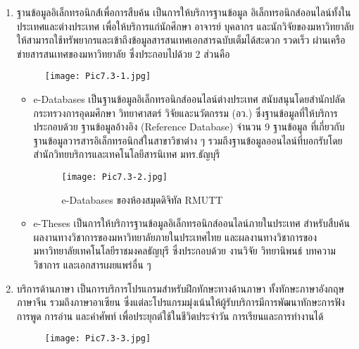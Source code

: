 \begin{enumerate}
\item ฐานข้อมูลอิเล็กทรอนิกส์์เพื่อการสืบค้น เป็นการให้บริการฐานข้อมูล
อิเล็กทรอนิกส์ออนไลน์ทั้งในประเทศและต่างประเทศ เพื่อให้บริการแก่นักศึกษา อาจารย์ บุคลากร และนักวิจัยของมหาวิทยาลัย ให้สามารถใช้ทรัพยากรและเข้าถึงข้อมูลสารสนเทศเอกสารฉบับเต็มได้สะดวก รวดเร็ว ผ่านเครือข่ายสารสนเทศของมหาวิทยาลัย  ซึ่งประกอบไปด้วย 2 ส่วนคือ
 \begin{figure}[H]
 	\begin{center}
 		\texttt{[image: Pic7.3-1.jpg]}\\
 	\end{center}
 \end{figure}
\begin{itemize}
	\item e-Databases เป็นฐานข้อมูลอิเล็กทรอนิกส์ออนไลน์ต่างประเทศ สนับสนุนโดยสำนักปลัดกระทรวงการอุดมศึกษา วิทยาศาสตร์ วิจัยและนวัตกรรม (อว.) ซึ่งฐานข้อมูลที่ให้บริการประกอบด้วย ฐานข้อมูลอ้างอิง (Reference Database) จำนวน 9 ฐานข้อมูล ที่เกี่ยวกับฐานข้อมูลวารสารอิเล็กทรอนิกส์ในสาขาวิชาต่าง ๆ รวมถึงฐานข้อมูลออนไลน์ที่บอกรับโดย สำนักวิทยบริการและเทคโนโลยีสารนิเทศ มทร.ธัญบุรี
	 \begin{figure}[H]
		\begin{center}
			\hspace*{2.2cm}
			\texttt{[image: Pic7.3-2.jpg]}\\
			\caption{e-Databases ของห้องสมุดดิจิทัล RMUTT}
		\end{center}
	\end{figure}
	\item e-Theses เป็นการให้บริการฐานข้อมูลอิเล็กทรอนิกส์ออนไลน์ภายในประเทศ สำหรับสืบค้น
	ผลงานทางวิชาการของมหาวิทยาลัยภายในประเทศไทย และผลงานทางวิชาการของมหาวิทยาลัยเทคโนโลยีราชมงคลธัญบุรี ซึ่งประกอบด้วย งานวิจัย วิทยานิพนธ์ บทความวิชาการ และเอกสารเผยแพร่อื่น ๆ
\end{itemize}
\item บริการด้านภาษา เป็นการบริการโปรแกรมสำหรับฝึกทักษะทางด้านภาษา ทั้งทักษะภาษาอังกฤษ 
ภาษาจีน รวมถึงภาษาอาเซียน ซึ่งแต่ละโปรแกรมมุ่งเน้นให้ผู้รับบริการมีการพัฒนาทักษะการฟัง การพูด การอ่าน และคำศัพท์ เพื่อประยุกต์ใช้ในชีวิตประจำวัน การเรียนและการทำงานได้
	 \begin{figure}[H]
	\begin{center}
		\hspace*{1.5cm}
		\texttt{[image: Pic7.3-3.jpg]}\\

\end{center}
\end{figure}
\end{enumerate}
